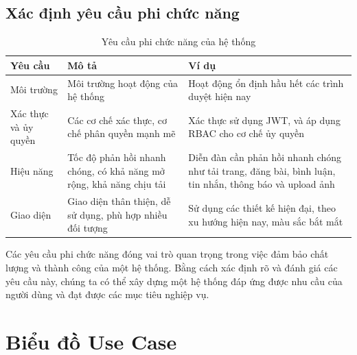 \documentclass[../index.tex]{subfiles}
\begin{document}
    \subsection{Xác định yêu cầu phi chức năng}
    \begin{table}[H]
        \centering
        {}
        \begin{tabular}{|p{2cm}|p{5cm}|p{7cm}|}
            \hline
            Yêu cầu              & Mô tả                                                               & Ví dụ                                                                                                   \\
            \hline
            Môi trường           & Môi trường hoạt động của hệ thống                                   & Hoạt động ổn định hầu hết các trình duyệt hiện nay                                                      \\
            \hline
            Xác thực và ủy quyền & Các cơ chế xác thực, cơ chế phân quyền mạnh mẽ                      & Xác thực sử dụng JWT, và áp dụng RBAC cho cơ chế ủy quyền                                               \\
            \hline
            Hiệu năng            & Tốc độ phản hồi nhanh chóng, có khả năng mở rộng, khả năng chịu tải & Diễn đàn cần phản hồi nhanh chóng như tải trang, đăng bài, bình luận, tin nhắn, thông báo và upload ảnh \\
            \hline
            Giao diện            & Giao diện thân thiện, dễ sử dụng, phù hợp nhiều đối tượng           & Sử dụng các thiết kế hiện đại, theo xu hướng hiện nay, màu sắc bắt mắt                                  \\
            \hline
        \end{tabular}
        \caption{Yêu cầu phi chức năng của hệ thống}
    \end{table}
    Các yêu cầu phi chức năng đóng vai trò quan trọng trong việc đảm bảo chất
    lượng và thành công của một hệ thống. Bằng cách xác định rõ và đánh giá các yêu
    cầu này, chúng ta có thể xây dựng một hệ thống đáp ứng được nhu cầu của
    người dùng và đạt được các mục tiêu nghiệp vụ.

    \section{Biểu đồ Use Case}
    
\end{document}
